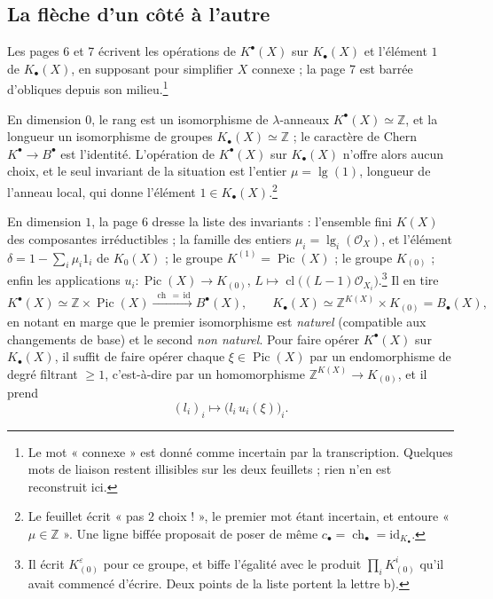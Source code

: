 \documentclass[11pt,a4paper]{article}
\begin{document}
\subsection*{La flèche d'un côté à l'autre}

Les pages 6 et 7 écrivent les opérations de $K^{\bullet}(X)$ sur
$K_{\bullet}(X)$ et l'élément $1$ de $K_{\bullet}(X)$, en supposant pour
simplifier $X$ connexe ; la page 7 est barrée d'obliques depuis son
milieu.\footnote{Le mot « connexe » est donné comme incertain par la
transcription. Quelques mots de liaison restent illisibles sur les deux
feuillets ; rien n'en est reconstruit ici.}

En dimension $0$, le rang est un isomorphisme de $\lambda$-anneaux
$K^{\bullet}(X) \simeq \mathbb{Z}$, et la longueur un isomorphisme de groupes
$K_{\bullet}(X) \simeq \mathbb{Z}$ ; le caractère de Chern $K^{\bullet} \to
B^{\bullet}$ est l'identité. L'opération de $K^{\bullet}(X)$ sur
$K_{\bullet}(X)$ n'offre alors aucun choix, et le seul invariant de la
situation est l'entier $\mu = \operatorname{lg}(1)$, longueur de l'anneau
local, qui donne l'élément $1 \in K_{\bullet}(X)$.\footnote{Le feuillet écrit
« pas $2$ choix ! », le premier mot étant incertain, et entoure
« $\mu \in \mathbb{Z}$ ». Une ligne biffée proposait de poser de même
$c_{\bullet} = \operatorname{ch}_{\bullet} = \mathrm{id}_{K_{\bullet}}$.}

En dimension $1$, la page 6 dresse la liste des invariants : l'ensemble fini
$K(X)$ des composantes irréductibles ; la famille des entiers $\mu_{i} =
\operatorname{lg}_{i}(\mathcal{O}_{X})$, et l'élément $\delta = 1 - \sum_{i}
\mu_{i} 1_{i}$ de $K_{0}(X)$ ; le groupe $K^{(1)} = \operatorname{Pic}(X)$ ;
le groupe $K_{(0)}$ ; enfin les applications
$u_{i} : \operatorname{Pic}(X) \to K_{(0)}$, $L \mapsto
\operatorname{cl}\bigl((L-1)\mathcal{O}_{X_{i}}\bigr)$.\footnote{Il écrit
$K^{\varepsilon}_{(0)}$ pour ce groupe, et biffe l'égalité avec le produit
$\prod_{i} K^{i}_{(0)}$ qu'il avait commencé d'écrire. Deux points de la liste
portent la lettre b).} Il en tire
\[
  K^{\bullet}(X) \simeq \mathbb{Z} \times \operatorname{Pic}(X)
  \xrightarrow{\ \operatorname{ch}\, =\, \mathrm{id}\ } B^{\bullet}(X),
  \qquad
  K_{\bullet}(X) \simeq \mathbb{Z}^{K(X)} \times K_{(0)} = B_{\bullet}(X),
\]
en notant en marge que le premier isomorphisme est \emph{naturel}
(compatible aux changements de base) et le second \emph{non naturel}. Pour
faire opérer $K^{\bullet}(X)$ sur $K_{\bullet}(X)$, il suffit de faire opérer
chaque $\xi \in \operatorname{Pic}(X)$ par un endomorphisme de degré filtrant
$\geqslant 1$, c'est-à-dire par un homomorphisme $\mathbb{Z}^{K(X)} \to
K_{(0)}$, et il prend
\[
  (l_{i})_{i} \longmapsto \bigl(l_{i}\, u_{i}(\xi)\bigr)_{i} .
\]
\end{document}
